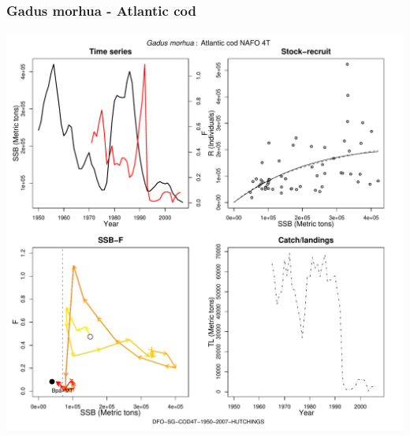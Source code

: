 \subsubsection{Gadus morhua - Atlantic cod}
\begin{center}
\includegraphics[width=1.2\textwidth]{../R/figures/DFO-SG-COD4T-1950-2007-HUTCHINGS.pdf}
\end{center}

